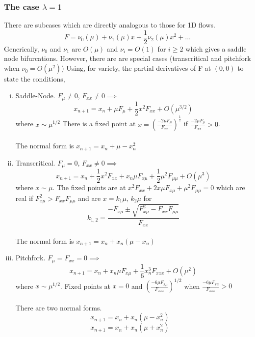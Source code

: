 \documentclass{article}
\begin{document}
\subsubsection{The case $\lambda =1$}
There are subcases which are directly analogous to those for 1D flows.
\[ F = \nu_0(\mu) + \nu_1(\mu) x + \frac{1}{2} \nu_2 (\mu) x^2 + \dots \]
Generically, $\nu_0$ and $\nu_1$ are $O(\mu)$ and $\nu_i =O(1)$ for $i\geq 2$
which gives a saddle node bifurcations. However, there are are special cases 
(transcritical and pitchfork when $\nu_0 = O(\mu^2)$)
Using, for variety, the partial derivatives of F at $(0,0)$ to state the 
conditions,
\begin{enumerate}[(i)]
\item Saddle-Node. $F_{\mu} \neq 0$, $F_{xx} \neq 0 \implies $
      \[x_{n+1} = x_n + \mu F_{\mu}
      + \frac{1}{2} x^2 F_{xx} + O(\mu^{3/2})\]
       where $x \sim \mu^{1/2}$
      There is a fixed point at $\displaystyle x = \left( \frac{-2\mu F_{\mu}}
      {F_{xx}} \right) ^{\frac{1}{2}}$ if  $\displaystyle 
      \frac{-2\mu F_{\mu}}{F_{xx}}  >0$.
      \\ %
      \\
      The normal form is $x_{n+1} = x_n + \mu - x_n^2$
\item Transcritical. $F_{\mu} =0$, $F_{xx} \neq 0 \implies$
      \[ x_{n+1} = x_n + \frac{1}{2} x^2 F_{xx} + x_n \mu F_{x\mu} + 
      \frac{1}{2}\mu^2 F_{\mu\mu} + O(\mu^3)\] 
      where $x \sim \mu$. The fixed points are at $x^2 F_{xx} + 
      2 x \mu F_{x\mu} + \mu^2 F_{\mu\mu} =0$ which are real if $F_{x\mu}^2 > F_{xx}
      F_{\mu\mu}$ and are $x = k_1 \mu , \, k_2 \mu$ for 
      \[ k_{1,2} = \frac{-F_{x\mu} \pm \sqrt{F_{x\mu}^2 - 
      F_{xx}F_{\mu\mu}}}{F_{xx}}\]
      \\ %
      The normal form is $x_{n+1} = x_n + x_n(\mu - x_n)$
\item Pitchfork. $F_\mu = F_{xx} =0 \implies$
      \[ x_{n+1} = x_n + x_n\mu F_{x\mu} + \frac{1}{6}x_n^3 F_{xxx} + 
      O(\mu^2)\] 
      where $x \sim \mu^{1/2}$. Fixed points at $x=0$ and $\displaystyle
      \left(\frac{-6\mu F_{x\mu}}{F_{xxx}} \right) ^{1/2}$ when 
      $\displaystyle \frac{-6\mu F_{x\mu}}{F_{xxx}} >0$
      \\
      \\
      There are two normal forms.
      \begin{equation}\tag{Supercritical}
       x_{n+1} = x_n + x_n (\mu - x_n^2) \quad \end{equation}
      \begin{equation}\tag{Subcritical} 
      x_{n+1} = x_n + x_n (\mu + x_n^2) \quad \end{equation}
\end{enumerate}
\end{document}
